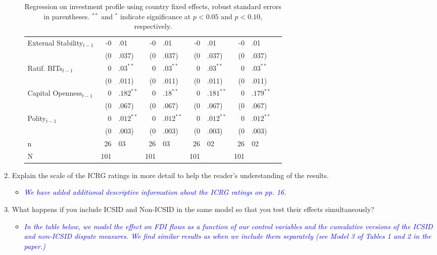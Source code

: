 \begin{enumerate}
\begin{itemize}
\begin{table}[ht]
\begin{tabular}{lr@{}lr@{}lr@{}lr@{}lr@{}}
			  External Stability$_{t-1}$ & -0&.01 & -0&.01 & -0&.01 & -0&.01 \\ 
			   & (0&.037) & (0&.037) & (0&.037) & (0&.037) \\ 
			  Ratif. BITs$_{t-1}$ & $0$&$.03^{\ast\ast}$ & $0$&$.03^{\ast\ast}$ & $0$&$.03^{\ast\ast}$ & $0$&$.03^{\ast\ast}$ \\ 
			   & (0&.011) & (0&.011) & (0&.011) & (0&.011) \\ 
			  Capital Openness$_{t-1}$ & $0$&$.182^{\ast\ast}$ & $0$&$.18^{\ast\ast}$ & $0$&$.181^{\ast\ast}$ & $0$&$.179^{\ast\ast}$ \\ 
			   & (0&.067) & (0&.067) & (0&.067) & (0&.067) \\ 
			  Polity$_{t-1}$ & $0$&$.012^{\ast\ast}$ & $0$&$.012^{\ast\ast}$ & $0$&$.012^{\ast\ast}$ & $0$&$.012^{\ast\ast}$ \\ 
			   & (0&.003) & (0&.003) & (0&.003) & (0&.003) \\ 
			   \hline
			n & 26&03 & 26&03 & 26&02 & 26&02 \\ 
			  N & 101 && 101 && 101 && 101 \\ 
			   \hline
			\hline
			\end{tabular}
			\endgroup
			\caption{Regression on investment profile using country fixed effects, robust standard errors in parentheses. $^{**}$ and $^{*}$ indicate significance at $p< 0.05 $ and $p< 0.10 $, respectively.} 
			\end{table}
			\FloatBarrier		

	\end{itemize}
	\item Explain the scale of the ICRG ratings in more detail to help the reader’s understanding of the results.	
	\begin{itemize}
		\item \textcolor{blue}{ \emph{ We have added additional descriptive information about the ICRG ratings on pp. 16. }}
	\end{itemize}
	
	\clearpage
	\item What happens if you include ICSID and Non-ICSID in the same model so that you test their effects simultaneously?		
	\begin{itemize}
		\item \textcolor{blue}{ \emph{ In the table below, we model the effect on FDI flows as a function of our control variables and the cumulative versions of the ICSID and non-ICSID dispute measures. We find similar results as when we include them separately (see Model 3 of Tables 1 and 2 in the paper.)}}


\end{itemize}
\end{enumerate}
